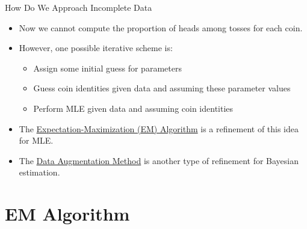 \documentclass[dvipdfmx,bigger,aspectratio=169]{beamer}
\begin{document}
\begin{frame}[label={sec:org295480b}]{How Do We Approach Incomplete Data}
\begin{itemize}
\item Now we cannot compute the proportion of heads among tosses for each coin.
\item However, one possible iterative scheme is:
\begin{itemize}
\item Assign some initial guess for parameters
\item Guess coin identities given data and assuming these parameter values
\item Perform MLE given data and assuming coin identities
\end{itemize}
\item The \hyperlink{sec:orgaa8e108}{Expectation-Maximization (EM) Algorithm} \cite{dempsterMaximumLikelihoodIncomplete1977} is a refinement of this idea for MLE.
\item The \hyperlink{sec:org5c7fb27}{Data Augmentation Method} \cite{tannerCalculationPosteriorDistributions1987} is another type of refinement for Bayesian estimation.
\end{itemize}
\end{frame}

\section{EM Algorithm}
\label{sec:orgaa8e108}
\begin{frame}[label={sec:org65031e8}]{}
\begin{center}
\end{center}
\end{frame}
\end{document}
